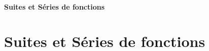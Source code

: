 \ifsolo
    ~

    \vspace{1cm}

    \begin{center}
        \textbf{\LARGE Suites et Séries de fonctions} \\[1em]
    \end{center}
    \tableofcontents
\else
    \chapter{Suites et Séries de fonctions}

    \minitoc
\fi
\thispagestyle{empty}
